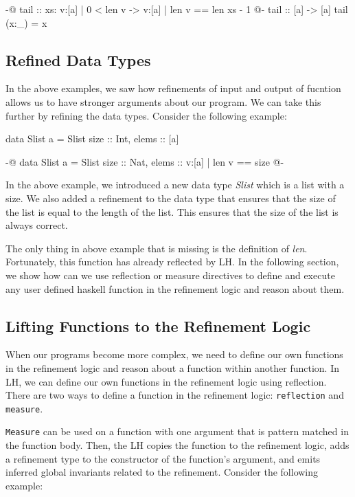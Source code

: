 \documentclass[]{rptuseminar}
\begin{document}
\begin{haskell}
 {-@ tail :: xs: {v:[a] | 0 < len v} -> {v:[a] | len v == len xs - 1} @-}
 tail :: [a] -> [a]
 tail (x:_) = x
\end{haskell}
\subsection{Refined Data Types}
In the above examples, we saw how refinements of input and output of fucntion allows us to have stronger arguments about our program. 
We can take this further by refining the data types. Consider the following example:

\begin{haskell}
  data Slist a = Slist { size :: Int, elems :: [a] }

  {-@ data Slist a = Slist { size :: Nat, elems :: {v:[a] | len v == size} } @-}
\end{haskell}

In the above example, we introduced a new data type \textit{Slist} which is a list with a size. 
We also added a refinement to the data type that ensures that the size of the list is equal to the length of the list. 
This ensures that the size of the list is always correct.

The only thing in above example that is missing is the definition of \textit{len}. Fortunately, this function has already reflected by
LH. In the following section, we show how can we use reflection or measure directives to define and execute any user defined haskell function in the refinement logic and
reason about them.

\subsection{Lifting Functions to the Refinement Logic}
When our programs become more complex, we need to define our own functions in the refinement logic and reason about
a function within another function. In LH, we can define our own functions in the refinement logic using reflection.
There are two ways to define a function in the refinement logic: \texttt{reflection} and \texttt{measure}. 

\texttt{Measure} can be used on a function with one argument that is pattern matched in the function body. Then, the
LH copies the function to the refinement logic, adds a refinement type to the constructor of the function's argument, and emits inferred global
invariants related to the refinement. Consider the following example:
\end{document}
